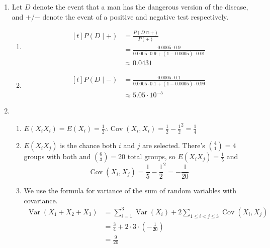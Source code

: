 \documentclass[12pt]{article}
\DeclareMathOperator{\Cov}{Cov}
\DeclareMathOperator{\Var}{Var}
\begin{document}
\begin{enumerate}
\begin{enumerate}
\begin{enumerate}
                        \end{enumerate}
                  \item Let $D$ denote the event that a man has the dangerous version of the disease,
                        and $+$/$-$ denote the event of a positive and negative test respectively.
                        \begin{enumerate}
                              \item \hfill\[\begin{aligned}[t]
                                    P(D \mid +)
                                           & = \frac{P(D \cap +)}{P(+)}              \\
                                           & = \frac{0.0005 \cdot 0.9}{0.0005 \cdot 0.9 + (1-0.0005) \cdot 0.01} \\
                                           & \approx \boxed{0.0431}
                              \end{aligned}\]\hfill\null
                              \item \hfill\[\begin{aligned}[t]
                                    P(D \mid -)
                                    &= \frac{0.0005 \cdot 0.1}{0.0005 \cdot 0.1 + (1-0.0005) \cdot 0.99} \\
                                    &\approx \boxed{5.05 \cdot 10^{-5}}
                              \end{aligned}\]\hfill\null
                        \end{enumerate}
                  \item \begin{enumerate}
                              \item $E(X_iX_i)=E(X_i)=\frac{1}{2} \therefore \Cov(X_i, X_i)=\frac{1}{2}-\frac{1}{2}^2=\boxed{\frac{1}{4}}$
                              \item $E(X_iX_j)$ is the chance both $i$ and $j$ are selected.
                                    There's $\binom{4}{1}=4$ groups with both and $\binom{6}{3}=20$ total groups,
                                    so $E(X_iX_j)=\frac{1}{5}$ and
                                    \[\Cov(X_i, X_j)=\frac{1}{5}-\frac{1}{2}^2=\boxed{-\frac{1}{20}}\]
                              \item We use the formula for variance of the sum of random variables with covariance.
                                    \begin{align*}
                                          \Var(X_1+X_2+X_3)
                                           & = \sum_{i=1}^{3} \Var(X_i)+2\sum_{1 \le i < j \le 3} {\Cov(X_i, X_j)} \\
                                           & = \frac{3}{4}+2 \cdot 3 \cdot \left(-\frac{1}{20}\right)              \\
                                           & = \boxed{\frac{9}{20}}
                                    \end{align*}
                        \end{enumerate}
            \end{enumerate}


\end{enumerate}
\end{document}
